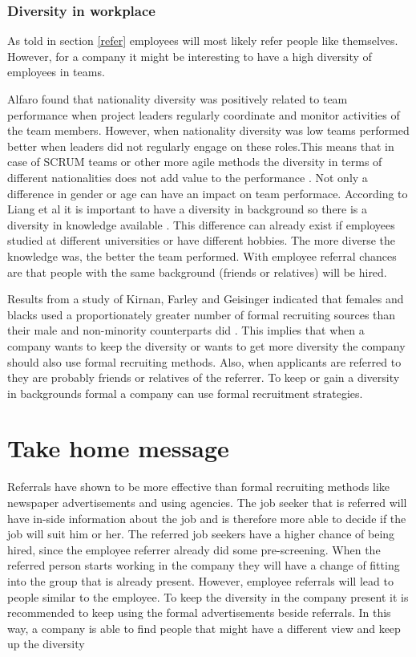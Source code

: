 \documentclass[a4paper, 11pt]{article} %
\begin{document}
\subsubsection*{Diversity in workplace}
As told in section \ref{refer} employees will most likely refer people like themselves. However, for a company it might be interesting to have a high diversity of employees in teams. 

Alfaro found that nationality diversity was positively related to team performance when project leaders regularly coordinate and monitor activities of the team members. However, when nationality diversity was low teams performed better when leaders did 
not regularly engage on these roles.This means that in case of SCRUM teams or other more agile methods the diversity in terms of different nationalities does not add value to the performance \cite{diversity}.
Not only a difference in gender or age can have an impact on team performace. According to Liang et al it is important to have a diversity in background so there is a diversity in knowledge available \cite{teamdiversity}. This difference can already exist if employees studied at different universities or have different hobbies. The more diverse the knowledge was, the better the team performed. With employee referral chances are that people with the same background (friends or relatives) will be hired. 

Results from a study of Kirnan, Farley and Geisinger indicated that females and blacks used a proportionately greater number of formal recruiting sources than their male and non-minority counterparts did \cite{tenth}. This implies that when a company wants to keep the diversity or wants to get more diversity the company should also use formal recruiting methods. Also, when applicants are referred to they are probably friends or relatives of the referrer. To keep or gain a diversity in backgrounds formal a company can use formal recruitment strategies.

\section*{Take home message}

Referrals have shown to be more effective than formal recruiting methods like newspaper advertisements and using agencies. The job seeker that is referred will have in-side information about the job and is therefore more able to decide if the job will suit him or her. The referred job seekers have a higher chance of being hired, since the employee referrer already did some pre-screening. When the referred person starts working in the company they will have a change of fitting into the group that is already present. However, employee referrals will lead to people similar to the employee. To keep the diversity in the company present it is recommended to keep using the formal advertisements beside referrals.  In this way, a company is able to find people that might have a different view and keep up the diversity
\end{document}
